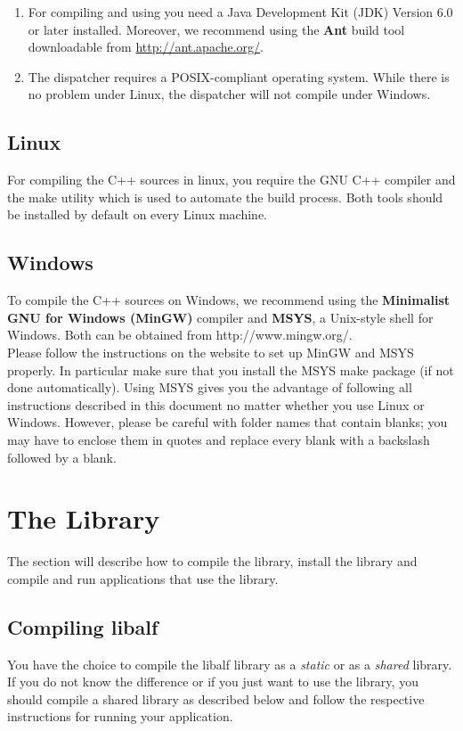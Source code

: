 \begin{enumerate}
 \item For compiling and using \jalf you need a Java Development Kit (JDK) Version 6.0 or later installed. Moreover, we recommend using the \textbf{Ant} build tool downloadable from \url{http://ant.apache.org/}.
 \item The dispatcher requires a POSIX-compliant operating system. While there is no problem under Linux, the dispatcher will not compile under Windows.
\end{enumerate}

\subsection*{Linux}
For compiling the C++ sources in linux, you require the GNU C++ compiler and the make utility which is used to automate the build process. Both tools should be installed by default on every Linux machine.

\subsection*{Windows}
To compile the C++ sources on Windows, we recommend using the \textbf{Minimalist GNU for Windows (MinGW)} compiler and \textbf{MSYS}, a Unix-style shell for Windows. Both can be obtained from http://www.mingw.org/. 
\\
Please follow the instructions on the website to set up MinGW and MSYS properly. In particular make sure that you install the MSYS make package (if not done automatically). Using MSYS gives you the advantage of following all instructions described in this document no matter whether you use Linux or Windows. However, please be careful with folder names that contain blanks; you may have to enclose them in quotes and replace every blank with a backslash followed by a blank.

\section{The \libalf \cpp Library}
\label{sec:libalf}
The section will describe how to compile the library, install the library and compile and run applications that use the library.

\subsection{Compiling libalf}
You have the choice to compile the libalf library as a \emph{static} or as a \emph{shared} library. If you do not know the difference or if you just want to use the library, you should compile a shared library as described below and follow the respective instructions for running your application.

